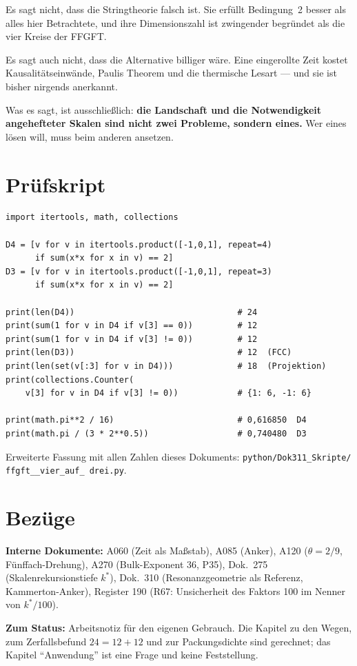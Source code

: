 \documentclass[11pt]{report}
\begin{document}
Es sagt nicht, dass die Stringtheorie falsch ist. Sie erfüllt
Bedingung~2 besser als alles hier Betrachtete, und ihre Dimensionszahl
ist zwingender begründet als die vier Kreise der FFGFT.

Es sagt auch nicht, dass die Alternative billiger wäre. Eine
eingerollte Zeit kostet Kausalitätseinwände, Paulis Theorem und die
thermische Lesart --- und sie ist bisher nirgends anerkannt.

Was es sagt, ist ausschließlich: \textbf{die Landschaft und die
Notwendigkeit angehefteter Skalen sind nicht zwei Probleme, sondern
eines.} Wer eines lösen will, muss beim anderen ansetzen.

\chapter{Prüfskript}

\begin{verbatim}
import itertools, math, collections

D4 = [v for v in itertools.product([-1,0,1], repeat=4)
      if sum(x*x for x in v) == 2]
D3 = [v for v in itertools.product([-1,0,1], repeat=3)
      if sum(x*x for x in v) == 2]

print(len(D4))                                 # 24
print(sum(1 for v in D4 if v[3] == 0))         # 12
print(sum(1 for v in D4 if v[3] != 0))         # 12
print(len(D3))                                 # 12  (FCC)
print(len(set(v[:3] for v in D4)))             # 18  (Projektion)
print(collections.Counter(
    v[3] for v in D4 if v[3] != 0))            # {1: 6, -1: 6}

print(math.pi**2 / 16)                         # 0,616850  D4
print(math.pi / (3 * 2**0.5))                  # 0,740480  D3
\end{verbatim}

Erweiterte Fassung mit allen Zahlen dieses Dokuments:
\texttt{python/\allowbreak Dok311\_\allowbreak Skripte/\allowbreak
ffgft\_\_\allowbreak vier\_\allowbreak auf\_\allowbreak
drei.py}.

\chapter{Bezüge}

\textbf{Interne Dokumente:} A060 (Zeit als Maßstab), A085 (Anker),
A120 ($\theta = 2/9$, Fünffach-Drehung), A270 (Bulk-Exponent 36, P35),
Dok.~275 (Skalenrekursionstiefe $k^*$), Dok.~310 (Resonanzgeometrie als
Referenz, Kammerton-Anker), Register 190 (R67: Unsicherheit des Faktors
100 im Nenner von $k^*/100$).

\medskip
\noindent\textbf{Zum Status:} Arbeitsnotiz für den eigenen Gebrauch.
Die Kapitel zu den Wegen, zum Zerfallsbefund $24 = 12+12$ und zur
Packungsdichte sind gerechnet; das Kapitel \enquote{Anwendung} ist eine
Frage und keine Feststellung.
\end{document}
